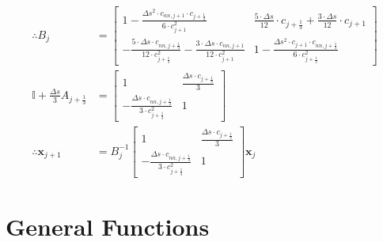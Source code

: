 \documentclass{article}
\begin{document}
\begin{align*}
	\therefore B_j                                   & = \begin{bmatrix} 1-\frac{\Delta s^2\cdot c_{nn, j+1}\cdot c_{j+\frac{1}{3}}}{6\cdot c_{j+1}^2} & \frac{5\cdot\Delta s}{12}\cdot c_{j+\frac{1}{3}} + \frac{3\cdot\Delta s}{12}\cdot c_{j+1} \\ -\frac{5\cdot\Delta s\cdot c_{nn, j+\frac{1}{3}}}{12\cdot c_{j+\frac{1}{3}}^2} - \frac{3\cdot\Delta s\cdot c_{nn, j+1}}{12\cdot c_{j+1}^2} & 1- \frac{\Delta s^2\cdot c_{j+1}\cdot c_{nn, j+\frac{1}{3}}}{6\cdot c_{j+\frac{1}{3}}^2} \end{bmatrix}                     \\
	\mathbb{I} + \frac{\Delta s}{3}A_{j+\frac{1}{3}} & = \begin{bmatrix} 1 & \frac{\Delta s\cdot c_{j+\frac{1}{3}}}{3} \\ -\frac{\Delta s\cdot c_{nn, j+\frac{1}{3}}}{3\cdot c_{j+\frac{1}{3}}^2} & 1 \end{bmatrix}                                                                                                                                                                                                                                                                                                                                                                                                                                                               \\
	\therefore \bm{x}_{j+1}                          & = B_j^{-1}\begin{bmatrix} 1 & \frac{\Delta s\cdot c_{j+\frac{1}{3}}}{3} \\ -\frac{\Delta s\cdot c_{nn, j+\frac{1}{3}}}{3\cdot c_{j+\frac{1}{3}}^2} & 1 \end{bmatrix}\bm{x}_j
\end{align*}

\section{General Functions}
\end{document}

